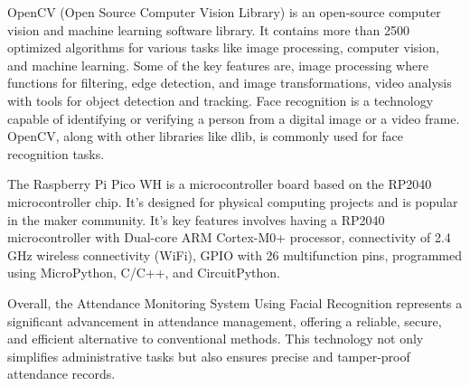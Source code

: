 \documentclass[12pt,a4paper]{report}
\begin{document}
\par OpenCV (Open Source Computer Vision Library) is an open-source computer vision and machine learning software library. It contains more than 2500 optimized algorithms for various tasks like image processing, computer vision, and machine learning. Some of the key features are, image processing where functions for filtering, edge detection, and image transformations, video analysis with tools for object detection and tracking. Face recognition is a technology capable of identifying or verifying a person from a digital image or a video frame. OpenCV, along with other libraries like dlib, is commonly used for face recognition tasks.\\
\par The Raspberry Pi Pico WH is a microcontroller board based on the RP2040 microcontroller chip. It's designed for physical computing projects and is popular in the maker community. It's key features involves having a RP2040 microcontroller with Dual-core ARM Cortex-M0+ processor, connectivity of 2.4 GHz wireless connectivity (WiFi), GPIO with 26 multifunction pins, programmed using MicroPython, C/C++, and CircuitPython.\\
\par Overall, the Attendance Monitoring System Using Facial Recognition represents a significant advancement in attendance management, offering a reliable, secure, and efficient alternative to conventional methods. This technology not only simplifies administrative tasks but also ensures precise and tamper-proof attendance records.
\end{document}
